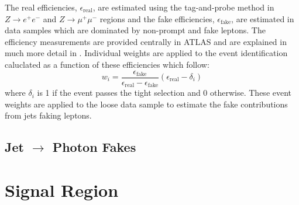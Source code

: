 The real efficiencies, $\epsilon_\text{real}$, are estimated using the tag-and-probe method in $Z\rightarrow e^+ e^-$ and $Z\rightarrow \mu^+ \mu^-$ regions and the fake efficiencies, $\epsilon_\text{fake}$, are estimated in data samples which are dominated by non-prompt and fake leptons.  The efficiency measurements are provided centrally in ATLAS and are explained in much more detail in \cite{MatrixMethod}.  Individual weights are applied to the event identification caluclated as a function of these efficiencies which follow:
\[ w_i = \frac{\epsilon_\text{fake}}{\epsilon_\text{real}-\epsilon_\text{fake}}(\epsilon_\text{real}-\delta_i) \]
where $\delta_i$ is 1 if the event passes the tight selection and 0 otherwise.  These event weights are applied to the loose data sample to estimate the fake contributions from jets faking leptons.

\subsection{Jet $\rightarrow$ Photon Fakes}
\label{sec:FakePho2}


\section{Signal Region}















